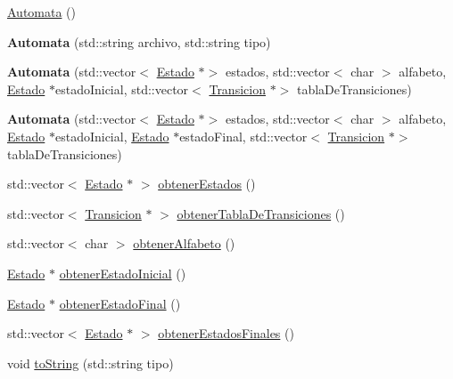 \begin{DoxyCompactItemize}
\item 
\hyperlink{class_automata_ae13e4a7c4d7f0291c80b252a2510ebff}{Automata} ()
\item 
\mbox{\label{class_automata_aa47afd5e2da0635037e6bd8c016d1f2c}} 
{\bfseries Automata} (std\+::string archivo, std\+::string tipo)
\item 
\mbox{\label{class_automata_a9842cc66caee1a9a3ded188753bdc863}} 
{\bfseries Automata} (std\+::vector$<$ \hyperlink{class_estado}{Estado} $\ast$$>$ estados, std\+::vector$<$ char $>$ alfabeto, \hyperlink{class_estado}{Estado} $\ast$estado\+Inicial, std\+::vector$<$ \hyperlink{class_transicion}{Transicion} $\ast$$>$ tabla\+De\+Transiciones)
\item 
\mbox{\label{class_automata_aaac8c053963a3aa29ccb2553c8c5a212}} 
{\bfseries Automata} (std\+::vector$<$ \hyperlink{class_estado}{Estado} $\ast$$>$ estados, std\+::vector$<$ char $>$ alfabeto, \hyperlink{class_estado}{Estado} $\ast$estado\+Inicial, \hyperlink{class_estado}{Estado} $\ast$estado\+Final, std\+::vector$<$ \hyperlink{class_transicion}{Transicion} $\ast$$>$ tabla\+De\+Transiciones)
\item 
std\+::vector$<$ \hyperlink{class_estado}{Estado} $\ast$ $>$ \hyperlink{class_automata_a9c728bd19771264ac35e95fd8b97069a}{obtener\+Estados} ()
\item 
std\+::vector$<$ \hyperlink{class_transicion}{Transicion} $\ast$ $>$ \hyperlink{class_automata_ae2b571c39f955aafb293ea9605a4a1bb}{obtener\+Tabla\+De\+Transiciones} ()
\item 
std\+::vector$<$ char $>$ \hyperlink{class_automata_af82a91d0826881327ee4b05723961c2f}{obtener\+Alfabeto} ()
\item 
\hyperlink{class_estado}{Estado} $\ast$ \hyperlink{class_automata_a00cdbcd4da13f79ce9b80935ca54eee7}{obtener\+Estado\+Inicial} ()
\item 
\hyperlink{class_estado}{Estado} $\ast$ \hyperlink{class_automata_a0aa43eed6361c006212719a97ffd920d}{obtener\+Estado\+Final} ()
\item 
std\+::vector$<$ \hyperlink{class_estado}{Estado} $\ast$ $>$ \hyperlink{class_automata_a57e9a913a7264f19b14401f01110df24}{obtener\+Estados\+Finales} ()
\item 
void \hyperlink{class_automata_ac95575b672e736c6f1bcc75f4cacf15d}{to\+String} (std\+::string tipo)
\end{DoxyCompactItemize}

